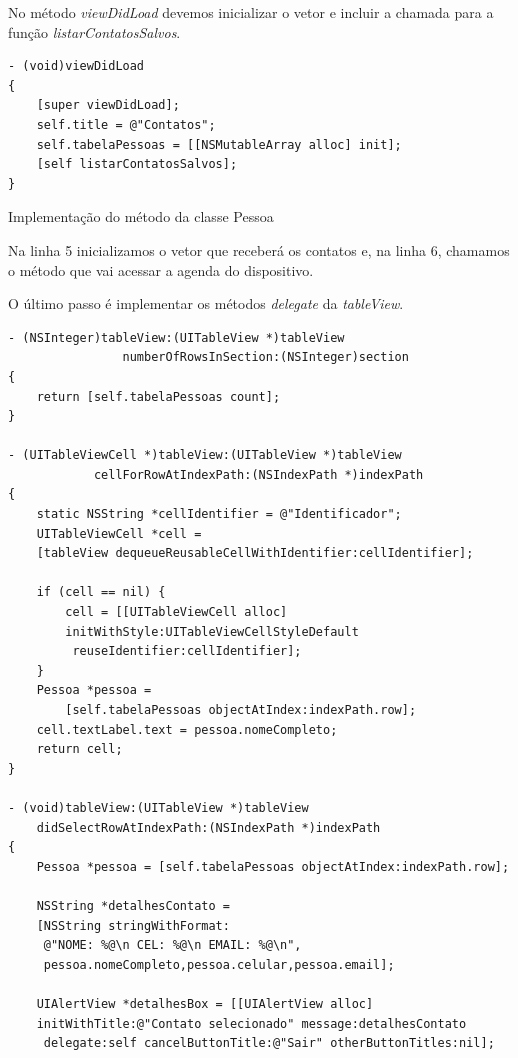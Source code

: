 \documentclass[a4paper,12pt,brazil,doubleside]{book}
\begin{document}
\begin{singlespace}
No método \emph{viewDidLoad} devemos inicializar o vetor e incluir a chamada para a função \emph{listarContatosSalvos}.

\begin{listing}[H]
\begin{verbatim}
- (void)viewDidLoad
{
    [super viewDidLoad];
    self.title = @"Contatos";
    self.tabelaPessoas = [[NSMutableArray alloc] init];
    [self listarContatosSalvos];   
}
\end{verbatim}
\caption{Implementação do método da classe Pessoa}
\end{listing}

Na linha 5 inicializamos o vetor que receberá os contatos e, na linha 6, chamamos o método que vai acessar a agenda do dispositivo. 

O último passo é implementar os métodos \emph{delegate} da \emph{tableView}.

\begin{listing}[H]
\begin{verbatim}
- (NSInteger)tableView:(UITableView *)tableView 
				numberOfRowsInSection:(NSInteger)section
{
    return [self.tabelaPessoas count];
}

- (UITableViewCell *)tableView:(UITableView *)tableView 
			cellForRowAtIndexPath:(NSIndexPath *)indexPath
{
    static NSString *cellIdentifier = @"Identificador";
    UITableViewCell *cell = 
    [tableView dequeueReusableCellWithIdentifier:cellIdentifier];
    
    if (cell == nil) {
        cell = [[UITableViewCell alloc] 
        initWithStyle:UITableViewCellStyleDefault 
         reuseIdentifier:cellIdentifier];
    }
    Pessoa *pessoa = 
    	[self.tabelaPessoas objectAtIndex:indexPath.row];
    cell.textLabel.text = pessoa.nomeCompleto;
    return cell;
}

- (void)tableView:(UITableView *)tableView 
	didSelectRowAtIndexPath:(NSIndexPath *)indexPath
{
    Pessoa *pessoa = [self.tabelaPessoas objectAtIndex:indexPath.row];
    
    NSString *detalhesContato = 
    [NSString stringWithFormat:
     @"NOME: %@\n CEL: %@\n EMAIL: %@\n",
     pessoa.nomeCompleto,pessoa.celular,pessoa.email];
    
    UIAlertView *detalhesBox = [[UIAlertView alloc] 
    initWithTitle:@"Contato selecionado" message:detalhesContato
     delegate:self cancelButtonTitle:@"Sair" otherButtonTitles:nil];    
     

\end{verbatim}
\end{listing}
\end{singlespace}
\end{document}
